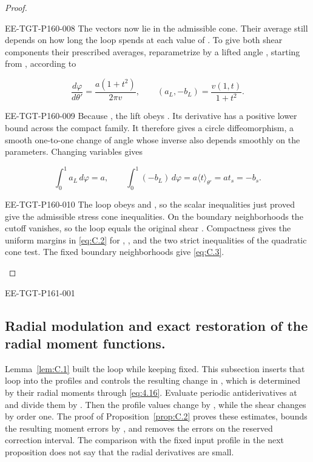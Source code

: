 \begin{proof}
\begin{EESegment}{EE-TGT-P160-008}
The vectors now lie in the admissible cone. Their average still depends on how long the loop
spends at each value of . To give both shear components their prescribed averages, reparametrize
 by a
lifted angle , starting from , according to
\end{EESegment}
\[
 \frac{d\varphi}{d\theta'}=\frac{a(1+t^2)}{2\pi v},
 \qquad (a_L,-b_L)=\frac{v(1,t)}{1+t^2}.
\]
\begin{EESegment}{EE-TGT-P160-009}
Because , the lift obeys
. Its derivative has a
positive lower bound across the compact family. It therefore gives a circle diffeomorphism, a smooth one-to-one change of angle whose inverse also depends smoothly on the parameters. Changing variables gives
\end{EESegment}
\[
 \int_0^1a_L\,d\varphi=a,
 \qquad
 \int_0^1(-b_L)\,d\varphi=a\langle t\rangle_{\theta'}=at_s=-b_s.
\]
\begin{EESegment}{EE-TGT-P160-010}
The loop obeys  and , so the scalar inequalities just proved give the admissible stress cone inequalities. On the boundary neighborhoods the cutoff
vanishes, so the loop equals the original shear . Compactness gives the uniform
margins in \eqref{eq:C.2} for , , and the two strict inequalities of the quadratic cone test. The fixed
boundary neighborhoods give \eqref{eq:C.3}.
\end{EESegment}
\end{proof}

%
\begin{EESegment}{EE-TGT-P161-001}
\subsection{Radial modulation and exact restoration of the radial moment functions.}\label{sec:C.2}
Lemma~\ref{lem:C.1} built the loop while keeping  fixed. This subsection inserts that loop into the
profiles  and controls the resulting change in , which is determined by their radial moments
through \eqref{eq:4.16}. Evaluate periodic antiderivatives at  and divide them by . Then the profile values change by , while the shear changes by order one. The proof of
Proposition~\ref{prop:C.2} proves these estimates, bounds the resulting moment errors by
,
and removes the errors on the reserved correction interval. The comparison with the fixed input
profile  in the next proposition does not say that the radial derivatives are small.
\end{EESegment}

